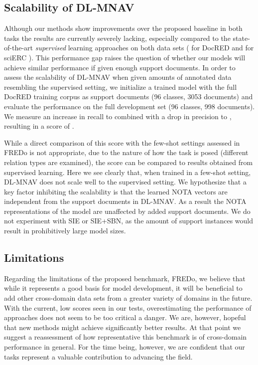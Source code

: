 \documentclass[11pt]{article}
\begin{document}
\subsection{Scalability of DL-MNAV}
Although our methods show improvements over the proposed baseline in both tasks the results are currently severely lacking, especially compared to the state-of-the-art \textit{supervised} learning approaches on both data sets (  for DocRED \cite{xu_entity_2021} and   for sciERC \cite{ye_pack_2021}). This performance gap raises the question of whether our models will achieve similar performance if given enough support documents.
In order to assess the scalability of DL-MNAV when given amounts of annotated data resembling the supervised setting, we initialize a trained model with the full DocRED training corpus as support documents (96 classes, 3053 documents) and evaluate the performance on the full development set (96 classes, 998 documents). We measure an increase in recall to  combined with a drop in precision to , resulting in a  score of . 

While a direct comparison of this score with the few-shot settings assessed in FREDo is not appropriate, due to the nature of how the task is posed (different relation types are examined), the score can be compared to results obtained from supervised learning. 
Here we see clearly that, when trained in a few-shot setting, DL-MNAV does not scale well to the supervised setting.
We hypothesize that a key factor inhibiting the scalability is that the learned NOTA vectors are independent from the support documents in DL-MNAV.
As a result the NOTA representations of the model are unaffected by added support documents.
We do not experiment with SIE or SIE+SBN, as the amount of support instances would result in prohibitively large model sizes.\\

\subsection{Limitations}
Regarding the limitations of the proposed benchmark, FREDo, we believe that while it represents a good basis for model development, it will be beneficial to add other cross-domain data sets from a greater variety of domains in the future.
With the current, low  scores seen in our tests, overestimating the performance of approaches does not seem to be too critical a danger. We are, however, hopeful that new methods might achieve significantly better results.
At that point we suggest a reassessment of how representative this benchmark is of cross-domain performance in general.
For the time being, however, we are confident that our tasks represent a valuable contribution to advancing the field.
\end{document}
